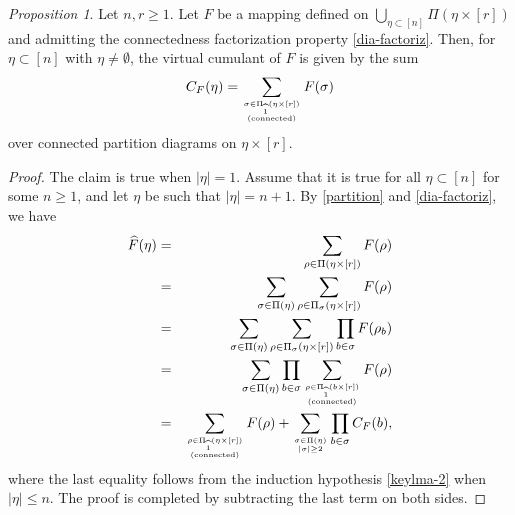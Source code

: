 \documentclass[bj,authoryear,noshowframe]{imsart}
\theoremstyle{plain}
\theoremstyle{remark}
\newtheorem{prop}{Proposition}[section]
\begin{document}
 \begin{prop}
 \label{mainthm-1}
 Let $n,r\geq 1$. 
 Let $F$ be a mapping defined on $\bigcup_{\eta \subset [n]}
  \Pi ( \eta \times [r])$ and admitting the {connectedness factorization} property
  \eqref{dia-factoriz}.
  Then, for $\eta \subset [n]$ with $\eta \ne\emptyset$, 
  the virtual cumulant of $F$ is given by the sum 
 \begin{equation}
 \label{keylma-2}
 C_F (\eta ) = \sum_{\sigma \in \Pi_{\widehat{1}} ( \eta \times [r] )
   \atop {\rm (connected)}}
 F(\sigma )
 \end{equation}
 over connected partition diagrams on $\eta \times [r]$. 
 \end{prop} 
 \begin{proof}
 The claim is true when $|\eta |=1$. %
 Assume that it is true for all $\eta \subset [n]$ for some $n \geq 1$, and 
  let $\eta$ be such that $|\eta |=n+1$.
  By \eqref{partition} and \eqref{dia-factoriz}, we have 
 \begin{eqnarray*}
   \widehat{F}(\eta )
   &=&
   \sum_{\rho \in \Pi (\eta \times [r])} F(\rho )
   \\
   &=&
   \sum_{\sigma \in \Pi (\eta )}
   \sum_{\rho \in \Pi_\sigma (\eta \times [r])} F(\rho )
   \\
   &=&
   \sum_{\sigma \in \Pi (\eta )}
   \sum_{\rho \in \Pi_\sigma (\eta \times [r])}
   \prod_{b \in \sigma} 
   F(\rho_b ) 
  \\
   &=&
   \sum_{\sigma \in \Pi (\eta )}
   \prod_{b \in \sigma } 
   \sum_{\rho \in \Pi_{\widehat{1}} (b \times [r])
     \atop {\rm (connected)}
   } 
   F(\rho )
  \\
   &=&
  \sum_{\rho \in \Pi_{\widehat{1}} ( \eta \times [r] )
    \atop {\rm (connected)}
  }
   F(\rho )
   +
   \sum_{\sigma \in \Pi (\eta ) \atop |\sigma |\geq 2}
   \prod_{b \in \sigma } 
   C_F (b ), 
 \end{eqnarray*}
 where the last equality follows from the induction hypothesis \eqref{keylma-2} 
 when $| \eta |\leq n$.
  The proof is completed by subtracting the last term on both sides. 
 \end{proof}
\end{document}
